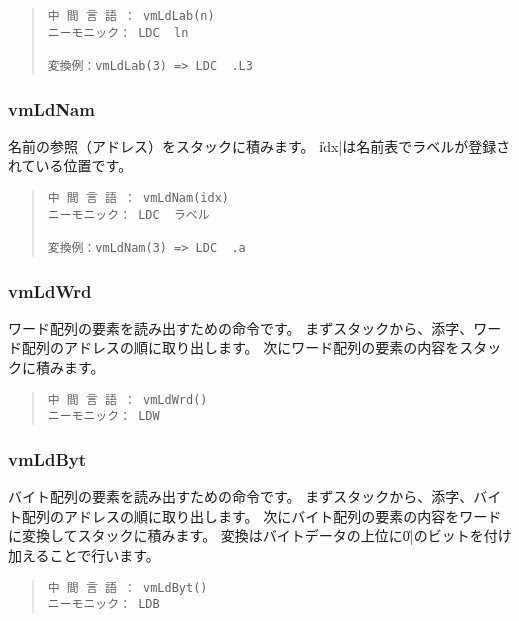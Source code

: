 \begin{quote}
\begin{verbatim}
中 間 言 語 ： vmLdLab(n)
ニーモニック： LDC  ln   

変換例：vmLdLab(3) => LDC  .L3
\end{verbatim}
\end{quote}

\subsubsection{vmLdNam}

名前の参照（アドレス）をスタックに積みます。
\|idx|は名前表でラベルが登録されている位置です。

\begin{quote}
\begin{verbatim}
中 間 言 語 ： vmLdNam(idx)
ニーモニック： LDC  ラベル

変換例：vmLdNam(3) => LDC  .a
\end{verbatim}
\end{quote}

\subsubsection{vmLdWrd}

ワード配列の要素を読み出すための命令です。
まずスタックから、添字、ワード配列のアドレスの順に取り出します。
次にワード配列の要素の内容をスタックに積みます。

\begin{quote}
\begin{verbatim}
中 間 言 語 ： vmLdWrd()
ニーモニック： LDW
\end{verbatim}
\end{quote}

\subsubsection{vmLdByt}

バイト配列の要素を読み出すための命令です。
まずスタックから、添字、バイト配列のアドレスの順に取り出します。
次にバイト配列の要素の内容をワードに変換してスタックに積みます。
変換はバイトデータの上位に\|0|のビットを付け加えることで行います。

\begin{quote}
\begin{verbatim}
中 間 言 語 ： vmLdByt()
ニーモニック： LDB
\end{verbatim}
\end{quote}

